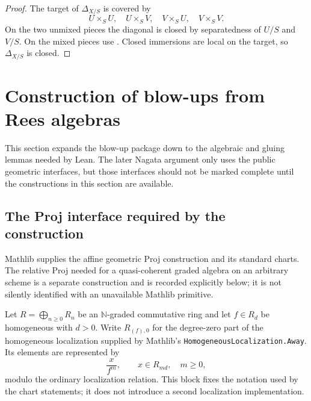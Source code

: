 \begin{proof}
  \leanok
  The target of $\Delta_{X/S}$ is covered by
  \[
    U\times_SU,\quad U\times_SV,\quad
    V\times_SU,\quad V\times_SV.
  \]
  On the two unmixed pieces the diagonal is closed by separatedness of $U/S$
  and $V/S$.  On the mixed pieces use
  .  Closed immersions are local on the
  target, so $\Delta_{X/S}$ is closed.
\end{proof}

\section{Construction of blow-ups from Rees algebras}
\label{sec:nagata-blowup-foundations}

This section expands the blow-up package down to the algebraic and gluing
lemmas needed by Lean.  The later Nagata argument only uses the public
geometric interfaces, but those interfaces should not be marked complete until
the constructions in this section are available.

\subsection{The Proj interface required by the construction}

Mathlib supplies the affine geometric Proj construction and its standard
charts.  The relative Proj needed for a quasi-coherent graded algebra on an
arbitrary scheme is a separate construction and is recorded explicitly below;
it is not silently identified with an unavailable Mathlib primitive.

\begin{definition}
  \label{def:nagata-homogeneous-localization-degree-zero}
  \leanok

  Let $R=\bigoplus_{n\geq0}R_n$ be an $\mathbb N$-graded commutative ring and
  let $f\in R_d$ be homogeneous with $d>0$.  Write $R_{(f),0}$ for the
  degree-zero part of the homogeneous localization supplied by Mathlib's
  \texttt{HomogeneousLocalization.Away}.  Its elements are represented by
  \[
    \frac{x}{f^m},\qquad x\in R_{md},\quad m\geq0,
  \]
  modulo the ordinary localization relation.  This block fixes the notation
  used by the chart statements; it does not introduce a second localization
  implementation.
\end{definition}

